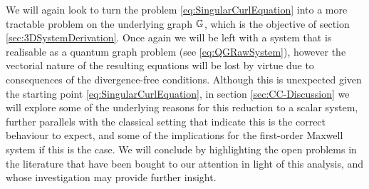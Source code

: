 We will again look to turn the problem \eqref{eq:SingularCurlEquation} into a more tractable problem on the underlying graph $\mathbb{G}$, which is the objective of section \ref{sec:3DSystemDerivation}.
Once again we will be left with a system that is realisable as a quantum graph problem (see \eqref{eq:QGRawSystem}), however the vectorial nature of the resulting equations will be lost by virtue due to consequences of the divergence-free conditions.
Although this is unexpected given the starting point \eqref{eq:SingularCurlEquation}, in section \ref{sec:CC-Discussion} we will explore some of the underlying reasons for this reduction to a scalar system, further parallels with the classical setting that indicate this is the correct behaviour to expect, and some of the implications for the first-order Maxwell system if this is the case.
We will conclude by highlighting the open problems in the literature that have been bought to our attention in light of this analysis, and whose investigation may provide further insight.